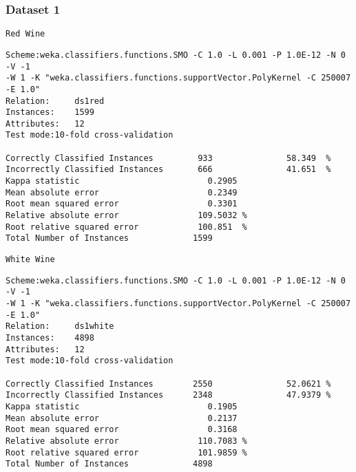 \documentclass[a4paper,12pt,openany]{report}
\newenvironment{wekaconsole}[1][]{

	\par \noindent
	\begin{samepage}
	\texttt{#1}
	\begin{mdframed}
	\small
	\ttfamily
}{
	\end{mdframed}
	\end{samepage}
}
\begin{document}
\subsubsection*{Dataset 1}
\begin{wekaconsole}[Red Wine]
\begin{verbatim}
Scheme:weka.classifiers.functions.SMO -C 1.0 -L 0.001 -P 1.0E-12 -N 0 -V -1
-W 1 -K "weka.classifiers.functions.supportVector.PolyKernel -C 250007
-E 1.0"
Relation:     ds1red
Instances:    1599
Attributes:   12
Test mode:10-fold cross-validation

Correctly Classified Instances         933               58.349  %
Incorrectly Classified Instances       666               41.651  %
Kappa statistic                          0.2905
Mean absolute error                      0.2349
Root mean squared error                  0.3301
Relative absolute error                109.5032 %
Root relative squared error            100.851  %
Total Number of Instances             1599
\end{verbatim}
\end{wekaconsole}

\begin{wekaconsole}[White Wine]
\begin{verbatim}
Scheme:weka.classifiers.functions.SMO -C 1.0 -L 0.001 -P 1.0E-12 -N 0 -V -1
-W 1 -K "weka.classifiers.functions.supportVector.PolyKernel -C 250007
-E 1.0"
Relation:     ds1white
Instances:    4898
Attributes:   12
Test mode:10-fold cross-validation

Correctly Classified Instances        2550               52.0621 %
Incorrectly Classified Instances      2348               47.9379 %
Kappa statistic                          0.1905
Mean absolute error                      0.2137
Root mean squared error                  0.3168
Relative absolute error                110.7083 %
Root relative squared error            101.9859 %
Total Number of Instances             4898     
\end{verbatim}
\end{wekaconsole}
\end{document}
